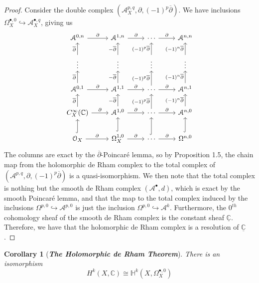 \documentclass[psamsfonts, 12pt]{amsart}
\newtheorem{cor}[thm]{Corollary}
\theoremstyle{definition}
\theoremstyle{remark}
\renewcommand{\O}{\mathcal{O}}
\newcommand{\ib}[1]{\textbf{\textit{#1}}}
\newcommand{\C}{\mathbb{C}}
\newcommand{\dbar}{\overline{\partial}}
\begin{document}
\begin{proof}
Consider the double complex $(\mathcal{A}^{p,q}_X, \partial, (-1)^p\dbar)$.
We have inclusions $\Omega^{\bullet,0}_X \hookrightarrow \mathcal{A}^{\bullet,q}_X$,
giving us
\[\begin{tikzcd}
\mathcal{A}^{0,n} \ar[r, "\partial"] & \mathcal{A}^{1,n} \ar[r,"\partial"]
& \cdots \ar[r, "\partial"] & \mathcal{A}^{n,n} \\
\vdots \ar[u, "\dbar"]& \vdots \ar[u, "-\dbar"]
& \vdots \ar[u, "(-1)^p\dbar"] & \vdots \ar[u, "(-1)^n\dbar"]\\
\mathcal{A}^{0,1} \ar[r, "\partial"] \ar[u, "\dbar"]
& \mathcal{A}^{1,1} \ar[r,"\partial"] \ar[u, "-\dbar"]
& \cdots \ar[r, "\partial"] \ar[u,"(-1)^p\dbar"]
& \mathcal{A}^{n,1} \ar[u, "(-1)^n\dbar"]\\
C^\infty_X(\C) \ar[r, "\partial"] \ar[u, "\dbar"]
& \mathcal{A}^{1,0} \ar[r,"\partial"] \ar[u, "-\dbar"]
& \cdots \ar[r, "\partial"] \ar[u, "(-1)^p\dbar"]
& \mathcal{A}^{n,0} \ar[u, "(-1)^n\dbar"]\\
\O_X \ar[r, "\partial"] \ar[u, hookrightarrow]
& \Omega^{1,0}_X \ar[r, "\partial"] \ar[u, hookrightarrow]
& \cdots \ar[r," \partial"] \ar[u, hookrightarrow] & \Omega^{n,0} \ar[u, hookrightarrow]
\end{tikzcd}\]
The columns are exact by the $\dbar$-Poincar\'e lemma, so by Proposition 1.5,
the chain map from the holomorphic de Rham complex to the total complex of
$(\mathcal{A}^{p,q}, \partial, (-1)^p\dbar)$ is a quasi-isomorphism.
We then note that the total complex is nothing but the smooth de Rham
complex $(\mathcal{A}^\bullet, d)$, which is exact by the smooth Poincar\'e lemma,
and that the map to the total complex induced by the inclusions
$\Omega^{p,0} \hookrightarrow \mathcal{A}^{p,0}$ is just the inclusion
$\Omega^{p,0} \hookrightarrow \mathcal{A}^k$. Furthermore, the $0^{th}$ cohomology
sheaf of the smooth de Rham complex is the constant sheaf $\underline{\C}$.
Therefore, we have that the holomorphic de Rham complex is a resolution of
$\underline{\C}$.
\end{proof}
%
\begin{cor}[\ib{The Holomorphic de Rham Theorem}]
There is an isomorphism
\[
H^k(X,\C) \cong \mathbb{H}^k(X, \Omega_X^{\bullet,0})
\]
\end{cor}
%
\newpage
%
\nocite{*}
%
\printbibliography
%
\end{document}
